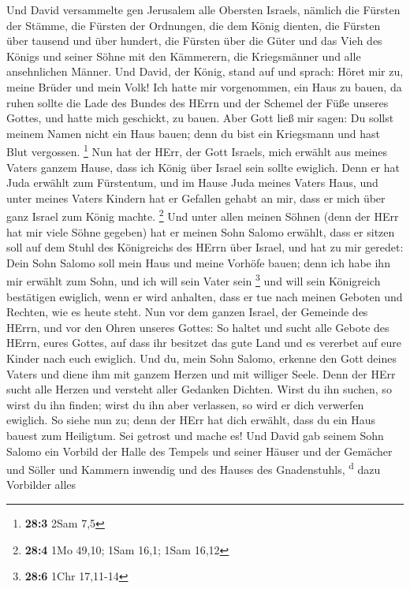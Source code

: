  Und David versammelte gen Jerusalem alle Obersten
Israels, nämlich die Fürsten der Stämme, die Fürsten der Ordnungen, die
dem König dienten, die Fürsten über tausend und über hundert, die
Fürsten über die Güter und das Vieh des Königs und seiner Söhne mit den
Kämmerern, die Kriegsmänner und alle ansehnlichen Männer. 
Und David, der König, stand auf und sprach: Höret mir zu, meine Brüder
und mein Volk! Ich hatte mir vorgenommen, ein Haus zu bauen, da ruhen
sollte die Lade des Bundes des HErrn und der Schemel der Füße unseres
Gottes, und hatte mich geschickt, zu bauen.  Aber Gott
ließ mir sagen: Du sollst meinem Namen nicht ein Haus bauen; denn du
bist ein Kriegsmann und hast Blut vergossen. \footnote{\textbf{28:3}
  2Sam 7,5}  Nun hat der HErr, der Gott Israels, mich
erwählt aus meines Vaters ganzem Hause, dass ich König über Israel sein
sollte ewiglich. Denn er hat Juda erwählt zum Fürstentum, und im Hause
Juda meines Vaters Haus, und unter meines Vaters Kindern hat er Gefallen
gehabt an mir, dass er mich über ganz Israel zum König machte.
\footnote{\textbf{28:4} 1Mo 49,10; 1Sam 16,1; 1Sam 16,12} 
Und unter allen meinen Söhnen (denn der HErr hat mir viele Söhne
gegeben) hat er meinen Sohn Salomo erwählt, dass er sitzen soll auf dem
Stuhl des Königreichs des HErrn über Israel,  und hat zu
mir geredet: Dein Sohn Salomo soll mein Haus und meine Vorhöfe bauen;
denn ich habe ihn mir erwählt zum Sohn, und ich will sein Vater sein
\footnote{\textbf{28:6} 1Chr 17,11-14}  und will sein
Königreich bestätigen ewiglich, wenn er wird anhalten, dass er tue nach
meinen Geboten und Rechten, wie es heute steht.  Nun vor
dem ganzen Israel, der Gemeinde des HErrn, und vor den Ohren unseres
Gottes: So haltet und sucht alle Gebote des HErrn, eures Gottes, auf
dass ihr besitzet das gute Land und es vererbet auf eure Kinder nach
euch ewiglich.  Und du, mein Sohn Salomo, erkenne den Gott
deines Vaters und diene ihm mit ganzem Herzen und mit williger Seele.
Denn der HErr sucht alle Herzen und versteht aller Gedanken Dichten.
Wirst du ihn suchen, so wirst du ihn finden; wirst du ihn aber
verlassen, so wird er dich verwerfen ewiglich.  So siehe
nun zu; denn der HErr hat dich erwählt, dass du ein Haus bauest zum
Heiligtum. Sei getrost und mache es!  Und David gab
seinem Sohn Salomo ein Vorbild der Halle des Tempels und seiner Häuser
und der Gemächer und Söller und Kammern inwendig und des Hauses des
Gnadenstuhls, \textsuperscript{d}  dazu Vorbilder alles
